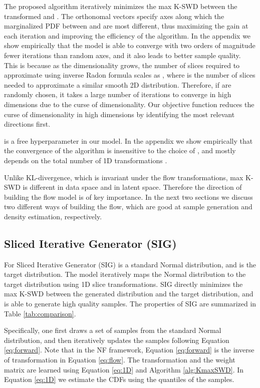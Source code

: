 \documentclass{article}
\begin{document}
The proposed algorithm iteratively minimizes the max K-SWD between the transformed  and . The orthonomal vectors  specify  axes along which the marginalized PDF between  and  are most different, thus maximizing the gain at each iteration and improving the efficiency of the algorithm. In the appendix we show empirically that the model is able to converge with two orders of magnitude fewer iterations than random axes, and it also leads to better sample quality. This is because as the dimensionality  grows, the number of slices  required to approximate  using inverse Radon formula scales as  \citep{kolouri2015radon}, where  is the number of slices needed to approximate a similar smooth 2D distribution. Therefore, if  are randomly chosen, it takes a large number of iterations to converge in high dimensions due to the curse of dimensionality. Our objective function reduces the curse of dimensionality in high dimensions by identifying the most relevant directions first. 


 is a free hyperparameter in our model. In the appendix we show empirically that the convergence of the algorithm is insensitive to the choice of , and mostly depends on the total number of 1D transformations . 


Unlike KL-divergence, which is invariant under the flow transformations, max K-SWD is different in data space and in latent space. Therefore the direction of building the flow model is of key importance. In the next two sections we discuss two different ways of building the flow, which are good at sample generation and density estimation, respectively.

\subsection{Sliced Iterative Generator (SIG)}

\label{subsec:SIG}

For Sliced Iterative Generator (SIG)  is a standard Normal distribution, and  is the target distribution. The model iteratively maps the Normal distribution to the target distribution using 1D slice transformations. 
SIG directly minimizes the max K-SWD between the generated distribution and the target distribution, and is able to generate high quality samples. The properties of SIG are summarized in Table \ref{tab:comparison}.

Specifically, one first draws a set of samples from the standard Normal distribution, and then iteratively updates the samples following Equation \ref{eq:forward}. Note that in the NF framework, Equation \ref{eq:forward} is the inverse of transformation  in Equation \ref{eq:flow}. The  transformation and the weight matrix  are learned using Equation \ref{eq:1D} and Algorithm \ref{alg:KmaxSWD}. In Equation \ref{eq:1D} we estimate the CDFs using the quantiles of the samples.
\end{document}

